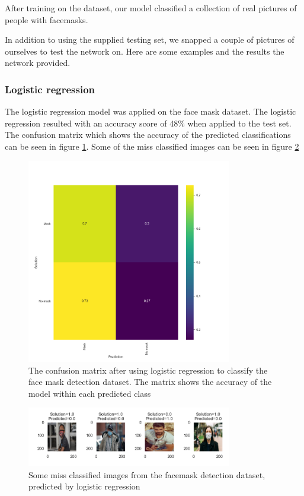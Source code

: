 \documentclass[../main.tex]{subfiles}
\begin{document}
After training on the dataset, our model classified a collection of real pictures of people with facemasks. 

In addition to using the supplied testing set, we snapped a couple of pictures of ourselves to test the network on. Here are some examples and the results the network provided.


\subsubsection{Logistic regression}
The logistic regression model was applied on the face mask dataset. The logistic regression resulted with an accuracy score of 48\% when applied to the test set. The confusion matrix which shows the accuracy of the predicted classifications can be seen in figure \ref{fig:logreg_facemask_cm}. Some of the miss classified images can be seen in figure \ref{fig:missclassified_logreg_facemask}

\begin{figure}[H]
    \centering
    \includegraphics[width=0.8\textwidth]{doc/assets/logreg_mask_heatmap_accuracy48_original_testset.png}
    \caption{The confusion matrix after using logistic regression to classify the face mask detection dataset. The matrix shows the accuracy of the model within each predicted class}
    \label{fig:logreg_facemask_cm}
\end{figure}

\begin{figure}[H]
    \centering
    \includegraphics[width=0.8\textwidth]{doc/assets/logreg_missclassified_facemask.png}
    \caption{Some miss classified images from the facemask detection dataset, predicted by logistic regression}
    \label{fig:missclassified_logreg_facemask}
\end{figure}
\end{document}
